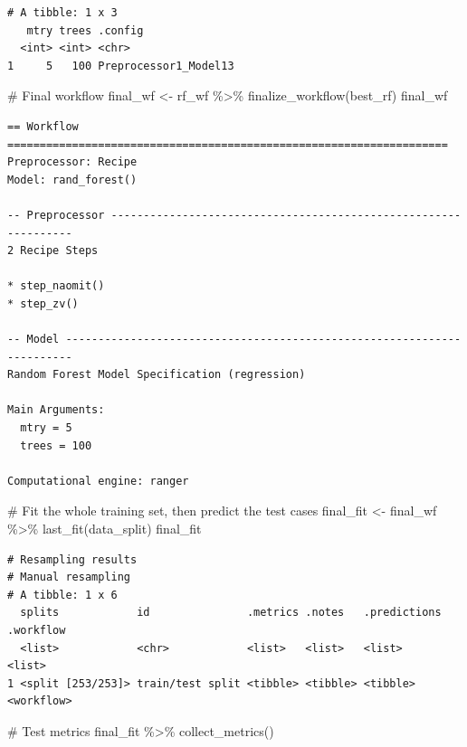 \documentclass[
]{article}
\newenvironment{Shaded}{\begin{snugshade}}{\end{snugshade}}
\newcommand{\CommentTok}[1]{\textcolor[rgb]{0.37,0.37,0.37}{#1}}
\newcommand{\FunctionTok}[1]{\textcolor[rgb]{0.28,0.35,0.67}{#1}}
\newcommand{\NormalTok}[1]{\textcolor[rgb]{0.00,0.23,0.31}{#1}}
\newcommand{\OtherTok}[1]{\textcolor[rgb]{0.00,0.23,0.31}{#1}}
\newcommand{\SpecialCharTok}[1]{\textcolor[rgb]{0.37,0.37,0.37}{#1}}
\begin{document}
\begin{verbatim}
# A tibble: 1 x 3
   mtry trees .config              
  <int> <int> <chr>                
1     5   100 Preprocessor1_Model13
\end{verbatim}

\begin{Shaded}
\begin{Highlighting}[]
\CommentTok{\# Final workflow}
\NormalTok{final\_wf }\OtherTok{\textless{}{-}}\NormalTok{ rf\_wf }\SpecialCharTok{\%\textgreater{}\%}
  \FunctionTok{finalize\_workflow}\NormalTok{(best\_rf)}
\NormalTok{final\_wf}
\end{Highlighting}
\end{Shaded}

\begin{verbatim}
== Workflow ====================================================================
Preprocessor: Recipe
Model: rand_forest()

-- Preprocessor ----------------------------------------------------------------
2 Recipe Steps

* step_naomit()
* step_zv()

-- Model -----------------------------------------------------------------------
Random Forest Model Specification (regression)

Main Arguments:
  mtry = 5
  trees = 100

Computational engine: ranger 
\end{verbatim}

\begin{Shaded}
\begin{Highlighting}[]
\CommentTok{\# Fit the whole training set, then predict the test cases}
\NormalTok{final\_fit }\OtherTok{\textless{}{-}} 
\NormalTok{  final\_wf }\SpecialCharTok{\%\textgreater{}\%}
  \FunctionTok{last\_fit}\NormalTok{(data\_split)}
\NormalTok{final\_fit}
\end{Highlighting}
\end{Shaded}

\begin{verbatim}
# Resampling results
# Manual resampling 
# A tibble: 1 x 6
  splits            id               .metrics .notes   .predictions .workflow 
  <list>            <chr>            <list>   <list>   <list>       <list>    
1 <split [253/253]> train/test split <tibble> <tibble> <tibble>     <workflow>
\end{verbatim}

\begin{Shaded}
\begin{Highlighting}[]
\CommentTok{\# Test metrics}
\NormalTok{final\_fit }\SpecialCharTok{\%\textgreater{}\%} 
  \FunctionTok{collect\_metrics}\NormalTok{()}
\end{Highlighting}
\end{Shaded}
\end{document}
